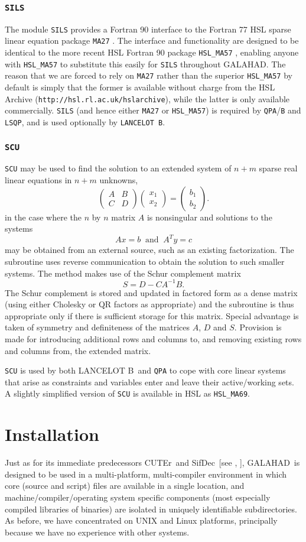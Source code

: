 \documentclass[acmtocl,acmnow]{acmtrans2m}
\newcommand{\tim}[1]{\;\; \mbox{#1} \;\;}
\newcommand{\gal}{{\sf GALAHAD}}
\newcommand{\lanb}{{\sf LANCELOT B}}
\newcommand{\cuter}{{\sf CUTEr}}
\newcommand{\sifdec}{{\sf SifDec}}
\newcommand{\ltsubsubsection}[1]{\subsubsection{{\tt #1}} \label{#1}}
\newcommand{\resetcounters}{\setcounter{equation}{0} \setcounter{figure}{0}
 \setcounter{table}{0}}
\newcommand{\lsection}[1]{\section{#1} \resetcounters \label{#1}}
\newcommand{\bciteb}[1]{\citeauthor{#1}, \citeyear{#1}}
\newcommand{\disp}[1]{\[{#1}\]}
\newcommand{\vect}[1]{\left(\begin{array}{c}#1\end{array}\right)}
\newcommand{\mat}[2]{\left(\begin{array}{#1}#2\end{array}\right)}
\begin{document}
\ltsubsubsection{SILS}

The module {\tt SILS} provides a Fortran 90 interface to the Fortran 77 HSL
sparse linear equation package {\tt MA27} \cite{DuffReid82}.
The interface and functionality are
designed to be identical to the more recent HSL Fortran 90
package {\tt HSL\_MA57} \cite{Duff01}, enabling anyone with {\tt HSL\_MA57}
to substitute this easily for {\tt SILS} throughout \gal. The reason
that we are forced to rely on {\tt MA27} rather than the superior
{\tt HSL\_MA57} by default is simply that
the former is available without charge from the HSL Archive
({\tt http://hsl.rl.ac.uk/hslarchive}), while the latter is only available
commercially.
{\tt SILS} (and hence either {\tt MA27} or {\tt HSL\_MA57})
is required by {\tt QPA}/{\tt B} and {\tt LSQP}, and is
used optionally by {\tt LANCELOT B}.

\ltsubsubsection{SCU}

{\tt SCU} may be used to find the solution
to an extended system of $n + m$
sparse real linear equations in $n  +  m$ unknowns,
\disp{\mat{cc}{ A & B \\ C & D } \vect{x_1 \\ x_2}
 =  \vect{b_1 \\ b_2}.}
in the case where the $n$ by $n$ matrix $A$ is nonsingular
and solutions to the systems
\disp{A x  =  b \tim{and} A^T y  =  c}
may be obtained from an external source, such as an existing
factorization.  The subroutine uses reverse communication to obtain
the solution to such smaller systems.  The method makes use of
the Schur complement matrix
\disp{S  =  D  -  C    A^{-1} B.}
The Schur complement is stored and updated in factored form as a dense matrix
(using either Cholesky or QR factors as appropriate)
and the subroutine is thus appropriate only if there is
sufficient storage for this matrix. Special advantage is taken
of symmetry and definiteness of the matrices $A$, $D$ and $S$.
Provision is made for introducing additional rows and columns
to, and removing existing rows and columns from, the extended matrix.

{\tt SCU} is used by both \lanb\ and {\tt QPA} to cope
with core linear systems that arise as constraints and variables
enter and leave their active/working sets. A slightly simplified
version of {\tt SCU} is available in HSL as {\tt HSL\_MA69}.

\lsection{Installation}

Just as for its immediate predecessors \cuter\ and \sifdec\
[see \bciteb{GoulOrbaToin02b}],
\gal\ is designed to be used in a multi-platform, multi-compiler
environment in which core (source and script) files are available
in a single location, and machine/compiler/operating system specific
components (most especially compiled libraries of binaries) are isolated in
uniquely identifiable subdirectories. As before, we have concentrated on
UNIX and Linux platforms, principally because we have no experience with
other systems.
\end{document}
